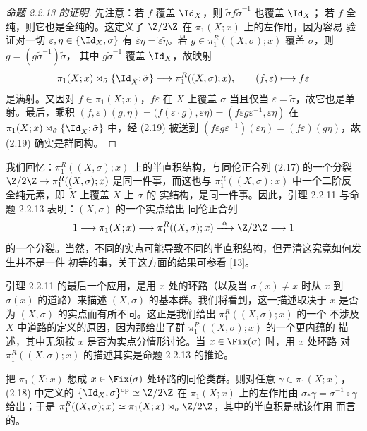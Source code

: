 \begin{proof}[命题 2.2.13 的证明]
先注意：若 $f$ 覆盖 $\Id_X$，则 $\tilde\sigma f\tilde\sigma^{-1}$ 也覆盖 $\Id_X$；
若 $f$ 全纯，则它也是全纯的。这定义了 $\Z/2\Z$ 在 $\pi_1(X;x)$ 上的左作用，因为容易
验证对一切 $\varepsilon,\eta\in\{\Id_X,\sigma\}$ 有
$\widetilde{\varepsilon\eta}=\tilde\varepsilon\tilde\eta$。若
$g\in\pi^R_1((X,\sigma);x)$ 覆盖 $\sigma$，则 $g=(g\tilde\sigma^{-1})\tilde\sigma$，
其中 $g\tilde\sigma^{-1}$ 覆盖 $\Id_X$，故映射
\begin{equation}\label{eq:2.19}
\pi_1(X;x)\rtimes_{\tilde\sigma}\{\Id_{\tilde X};\tilde\sigma\}
\longrightarrow\pi^R_1((X,\sigma);x),
\qquad (f,\varepsilon)\longmapsto f\varepsilon
\end{equation}
是满射。又因对 $f\in\pi_1(X;x)$，$f\varepsilon$ 在 $X$ 上覆盖 $\sigma$ 当且仅当
$\varepsilon=\tilde\sigma$，故它也是单射。最后，乘积
$(f,\varepsilon)(g,\eta)=\bigl(f(\varepsilon\cdot g),\varepsilon\eta\bigr)
=(f\varepsilon g\varepsilon^{-1},\varepsilon\eta)$ 在
$\pi_1(X;x)\rtimes_{\tilde\sigma}\{\Id_{\tilde X};\tilde\sigma\}$ 中，经 (2.19) 被送到
$(f\varepsilon g\varepsilon^{-1})(\varepsilon\eta)=(f\varepsilon)(g\eta)$，故 (2.19)
确实是群同构。
\end{proof}

我们回忆：$\pi^R_1((X,\sigma);x)$ 上的半直积结构，与同伦正合列 (2.17) 的一个分裂
$\Z/2\Z\to\pi^R_1((X,\sigma);x)$ 是同一件事，而这也与
$\pi^R_1((X,\sigma);x)$ 中一个二阶反全纯元素，即 $\tilde X$ 上覆盖 $X$ 上 $\sigma$ 的
实结构，是同一件事。因此，引理 2.2.11 与命题 2.2.13 表明：$(X,\sigma)$ 的一个实点给出
同伦正合列
\[
1\longrightarrow\pi_1(X;x)\longrightarrow\pi^R_1((X,\sigma);x)
\xrightarrow{\ \alpha\ }\Z/2\Z\longrightarrow1
\]
的一个分裂。当然，不同的实点可能导致不同的半直积结构，但弄清这究竟如何发生并不是一件
初等的事，关于这方面的结果可参看 [13]。

引理 2.2.11 的最后一个应用，是用 $x$ 处的环路（以及当 $\sigma(x)\ne x$ 时从 $x$ 到
$\sigma(x)$ 的道路）来描述 $(X,\sigma)$ 的基本群。我们将看到，这一描述取决于 $x$
是否为 $(X,\sigma)$ 的实点而有所不同。这正是我们给出 $\pi^R_1((X,\sigma);x)$ 的一个
不涉及 $X$ 中道路的定义的原因，因为那给出了群 $\pi^R_1((X,\sigma);x)$ 的一个更内蕴的
描述，其中无须按 $x$ 是否为实点分情形讨论。当 $x\in\Fix(\sigma)$ 时，用 $x$ 处环路
对 $\pi^R_1((X,\sigma);x)$ 的描述其实是命题 2.2.13 的推论。

\begin{corollary}\label{cor:2.2.14}
把 $\pi_1(X;x)$ 想成 $x\in\Fix(\sigma)$ 处环路的同伦类群。则对任意
$\gamma\in\pi_1(X;x)$，(2.18) 中定义的 $\{\Id_X,\sigma\}^{\mathrm{op}}\simeq\Z/2\Z$
在 $\pi_1(X;x)$ 上的左作用由 $\sigma_*\gamma=\sigma^{-1}\circ\gamma$ 给出；于是
$\pi^R_1((X,\sigma);x)\simeq\pi_1(X;x)\rtimes_\sigma\Z/2\Z$，其中的半直积是就该作用
而言的。
\end{corollary}

